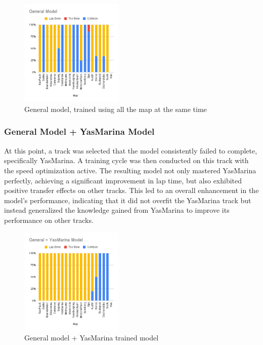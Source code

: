 \documentclass[conference]{IEEEtran}
\begin{document}
\begin{figure}[ht]
    \centering
    \includegraphics[width=0.439\textwidth]{img/GeneralModel.png}
    \caption{General model, trained using all the map at the same time}
    \label{fig:general_train}
\end{figure}

%
%
%
\subsubsection{General Model + YasMarina Model}
At this point, a track was selected that the model consistently failed to complete, specifically YasMarina. A training cycle was then conducted on this track with the speed optimization active. The resulting model not only mastered YasMarina perfectly, achieving a significant improvement in lap time, but also exhibited positive transfer effects on other tracks. This led to an overall enhancement in the model's performance, indicating that it did not overfit the YasMarina track but instead generalized the knowledge gained from YasMarina to improve its performance on other tracks.

\begin{figure}[ht]
    \centering
    \includegraphics[width=0.439\textwidth]{img/General + YasMarina Model.png}
    \caption{General model + YasMarina trained model}
    \label{fig:YasMarina_train}
\end{figure}
\end{document}
